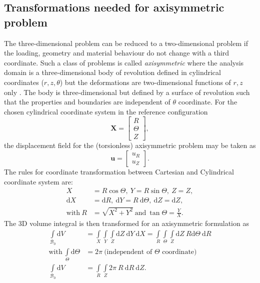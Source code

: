 \documentclass[11pt,a4paper,final]{article}
\begin{document}
\subsection{Transformations needed for axisymmetric problem}
The three-dimensional problem can be reduced to a two-dimensional problem if the loading, geometry and material behaviour do not change with a third coordinate. Such a class of problems is called \textit{axisymmetric} where the analysis domain is a three-dimensional body of revolution defined in cylindrical coordinates ($r, z, \theta$) but the deformations are two-dimensional functions of $r, z$ only \cite{Zienkiewicz2013}. The body is three-dimensional but defined by a surface of revolution such that the properties and boundaries are independent of $\theta$ coordinate. For the chosen cylindrical coordinate system in the reference configuration
\begin{equation}
\mathbf{X} = \begin{bmatrix}
R \\
\Theta \\
Z
\end{bmatrix},
\end{equation}
the displacement field for the (torsionless) axisymmetric problem may be taken as 
\begin{equation}
\mathbf{u} = \begin{bmatrix}
u_R \\
u_Z
\end{bmatrix}.
\label{eq:1.25}
\end{equation}
The rules for coordinate transformation between Cartesian and Cylindrical coordinate system are:
\begin{align}
X &= R \cos \Theta, \ Y = R \sin \Theta, \ Z = Z, \nonumber \\
\mathrm{d}X &= \mathrm{d}R, \ \mathrm{d}Y = R \ \mathrm{d} \Theta, \ \mathrm{d}Z = \mathrm{d}Z, \nonumber \\
\text{with} \ R &= \sqrt{X^2 + Y^2} \ \text{and} \ \tan \Theta = \frac{Y}{X}.
\end{align}
The 3D volume integral is then transformed for an axisymmetric formulation as
\begin{align}
\int\limits_{\mathcal{B}_0} \mathrm{d} V &= \int\limits_{X} \int\limits_{Y} \int\limits_{Z} \mathrm{d} Z \ \mathrm{d} Y \ \mathrm{d} X = \int\limits_{R} \int\limits_{\Theta} \int\limits_{Z} \mathrm{d} Z \ R \mathrm{d} \Theta \ \mathrm{d} R \nonumber \\
\text{with} \ \int\limits_{\Theta} \mathrm{d} \Theta &= 2 \pi \ \text{(independent of $\Theta$ coordinate)} \nonumber \\
\int\limits_{\mathcal{B}_0} \mathrm{d} V &= \int\limits_{R} \int\limits_{Z} 2 \pi \ R \ \mathrm{d} R \ \mathrm{d} Z. 
\end{align}
\end{document}
